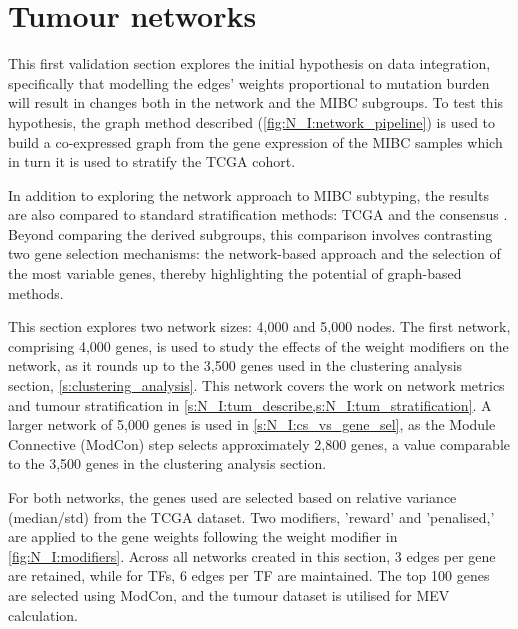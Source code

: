 \section{Tumour networks} \label{s:N_I:tum}


This first validation section explores the initial hypothesis on data integration, specifically that modelling the edges' weights proportional to mutation burden will result in changes both in the network and the MIBC subgroups. To test this hypothesis, the graph method described (\cref{fig:N_I:network_pipeline}) is used to build a co-expressed graph from the gene expression of the MIBC samples which in turn it is used to stratify the TCGA cohort.

In addition to exploring the network approach to MIBC subtyping, the results are also compared to standard stratification methods: TCGA \citep{Robertson2017-mg} and the consensus \citep{Kamoun2020-tj}. Beyond comparing the derived subgroups, this comparison involves contrasting two gene selection mechanisms: the network-based approach and the selection of the most variable genes, thereby highlighting the potential of graph-based methods.

This section explores two network sizes: 4,000 and 5,000 nodes. The first network, comprising 4,000 genes, is used to study the effects of the weight modifiers on the network, as it rounds up to the 3,500 genes used in the clustering analysis section, \cref{s:clustering_analysis}. This network covers the work on network metrics and tumour stratification in \cref{s:N_I:tum_describe,s:N_I:tum_stratification}. A larger network of 5,000 genes is used in \cref{s:N_I:cs_vs_gene_sel}, as the Module Connective (ModCon) step selects approximately 2,800 genes, a value comparable to the 3,500 genes in the clustering analysis section.

For both networks, the genes used are selected based on relative variance (median/std) from the TCGA dataset. Two modifiers, 'reward' and 'penalised,' are applied to the gene weights following the weight modifier in \cref{fig:N_I:modifiers}. Across all networks created in this section, 3 edges per gene are retained, while for TFs, 6 edges per TF are maintained. The top 100 genes are selected using ModCon, and the tumour dataset is utilised for MEV calculation.


